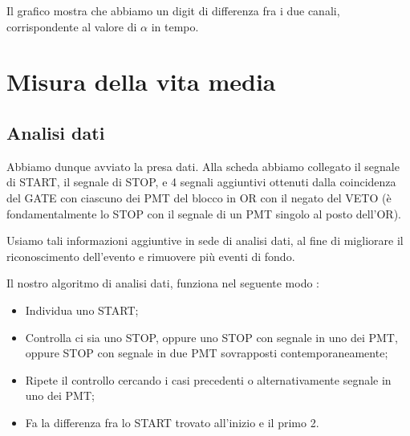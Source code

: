 \documentclass[10pt,a4paper]{article}
\begin{document}
Il grafico mostra che abbiamo un digit di differenza fra i due canali, corrispondente al valore di $\alpha$ in tempo.

\section{Misura della vita media}

\subsection{Analisi dati}

Abbiamo dunque avviato la presa dati. Alla scheda abbiamo collegato il segnale di START, il segnale di STOP, e 4 segnali aggiuntivi ottenuti dalla coincidenza del GATE con ciascuno dei PMT del blocco in OR con il negato del VETO (è fondamentalmente lo STOP con il segnale di un PMT singolo al posto dell'OR).

Usiamo tali informazioni aggiuntive in sede di analisi dati, al fine di migliorare il riconoscimento dell'evento e rimuovere più eventi di fondo. 

Il nostro algoritmo di analisi dati, funziona nel seguente modo :

\begin{itemize}
\item Individua uno START;
\item Controlla ci sia uno STOP, oppure uno STOP con segnale in uno dei PMT, oppure STOP con segnale in due PMT sovrapposti contemporaneamente;
\item Ripete il controllo cercando i casi precedenti o alternativamente segnale in uno dei PMT;
\item Fa la differenza fra lo START trovato all'inizio e il primo 2.
\end{itemize}
\end{document}
